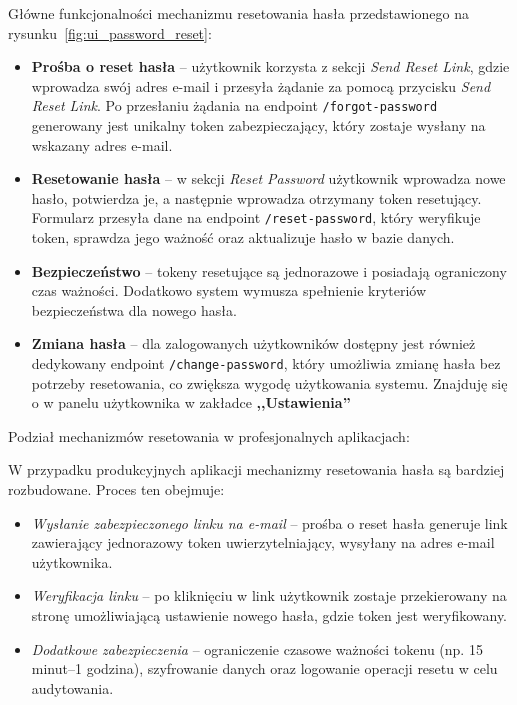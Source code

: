 Główne funkcjonalności mechanizmu resetowania hasła przedstawionego na rysunku~\ref{fig:ui_password_reset}:

\begin{itemize}
    \item \textbf{Prośba o reset hasła} -- użytkownik korzysta z sekcji \emph{Send Reset Link}, gdzie wprowadza swój adres e-mail i przesyła żądanie za pomocą przycisku \emph{Send Reset Link}. Po przesłaniu żądania na endpoint \texttt{/forgot-password} generowany jest unikalny token zabezpieczający, który zostaje wysłany na wskazany adres e-mail.
    
    \item \textbf{Resetowanie hasła} -- w sekcji \emph{Reset Password} użytkownik wprowadza nowe hasło, potwierdza je, a następnie wprowadza otrzymany token resetujący. Formularz przesyła dane na endpoint \texttt{/reset-password}, który weryfikuje token, sprawdza jego ważność oraz aktualizuje hasło w bazie danych.

    \item \textbf{Bezpieczeństwo} -- tokeny resetujące są jednorazowe i posiadają ograniczony czas ważności. Dodatkowo system wymusza spełnienie kryteriów bezpieczeństwa dla nowego hasła.

    \item \textbf{Zmiana hasła} -- dla zalogowanych użytkowników dostępny jest również dedykowany endpoint \texttt{/change-password}, który umożliwia zmianę hasła bez potrzeby resetowania, co zwiększa wygodę użytkowania systemu. Znajduję się o w panelu użytkownika w zakładce \textbf{,,Ustawienia''}
\end{itemize}


Podział mechanizmów resetowania w profesjonalnych aplikacjach:

W przypadku produkcyjnych aplikacji mechanizmy resetowania hasła są bardziej rozbudowane. Proces ten obejmuje:
\begin{itemize}
    \item \emph{Wysłanie zabezpieczonego linku na e-mail} -- prośba o reset hasła generuje link zawierający jednorazowy token uwierzytelniający, wysyłany na adres e-mail użytkownika.
    \item \emph{Weryfikacja linku} -- po kliknięciu w link użytkownik zostaje przekierowany na stronę umożliwiającą ustawienie nowego hasła, gdzie token jest weryfikowany.
    \item \emph{Dodatkowe zabezpieczenia} -- ograniczenie czasowe ważności tokenu (np. 15 minut–1 godzina), szyfrowanie danych oraz logowanie operacji resetu w celu audytowania.
\end{itemize}


